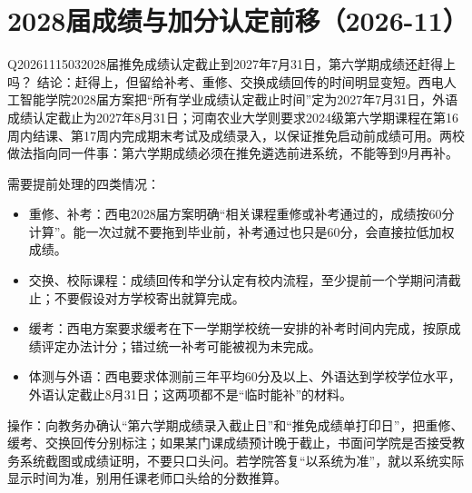 \section{2028届成绩与加分认定前移（2026-11）}

\begin{qa}{Q2026111503}{2028届推免成绩认定截止到2027年7月31日，第六学期成绩还赶得上吗？}
结论：赶得上，但留给补考、重修、交换成绩回传的时间明显变短。西电人工智能学院2028届方案把“所有学业成绩认定截止时间”定为2027年7月31日，外语成绩认定截止为2027年8月31日；河南农业大学则要求2024级第六学期课程在第16周内结课、第17周内完成期末考试及成绩录入，以保证推免启动前成绩可用。两校做法指向同一件事：第六学期成绩必须在推免遴选前进系统，不能等到9月再补。

需要提前处理的四类情况：

\begin{itemize}
\item 重修、补考：西电2028届方案明确“相关课程重修或补考通过的，成绩按60分计算”。能一次过就不要拖到毕业前，补考通过也只是60分，会直接拉低加权成绩。
\item 交换、校际课程：成绩回传和学分认定有校内流程，至少提前一个学期问清截止；不要假设对方学校寄出就算完成。
\item 缓考：西电方案要求缓考在下一学期学校统一安排的补考时间内完成，按原成绩评定办法计分；错过统一补考可能被视为未完成。
\item 体测与外语：西电要求体测前三年平均60分及以上、外语达到学校学位水平，外语认定截止8月31日；这两项都不是“临时能补”的材料。
\end{itemize}

操作：向教务办确认“第六学期成绩录入截止日”和“推免成绩单打印日”，把重修、缓考、交换回传分别标注；如果某门课成绩预计晚于截止，书面问学院是否接受教务系统截图或成绩证明，不要只口头问。若学院答复“以系统为准”，就以系统实际显示时间为准，别用任课老师口头给的分数推算。
\end{qa}

